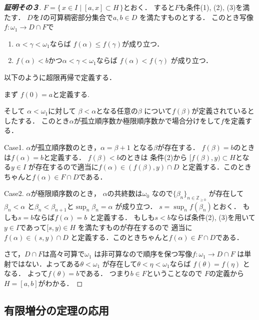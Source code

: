 \documentclass[leqno, a4paper, 12pt]{jsarticle}
\newcommand{\zz}{\mathbb{Z}}
\renewcommand{\labelenumi}{{\rm (\arabic{enumi})}}
\begin{document}
\begin{proof}[\textbf{証明その３}]
$F=\{\, x\in I\mid [a, x]\subset H\, \}$とおく．
すると$F$も条件(1), (2), (3)を満たす．
$D$を$I$の可算稠密部分集合で$a, b\in D$
を満たすものとする．
このとき写像
$f: \omega_{1}\to D\cap F$で
\begin{enumerate}
\renewcommand{\labelenumi}{(\alph{enumi})}
\item 
$\alpha<\gamma<\omega_{1}$ならば
$f(\alpha)\le f(\gamma)$が成り立つ．
\item 
$f(\alpha)<b$かつ$\alpha<\gamma<\omega_{1}$ならば
$f(\alpha)<f(\gamma)$
が成り立つ．

\end{enumerate}
以下のように超限再帰で定義する．

まず
$f(0)=a$と定義する. 

そして
$\alpha<\omega_{1}$に対して
$\beta<\alpha$となる任意の$\beta$
について$f(\beta)$が定義されているとしたする．
このとき$\alpha$が孤立順序数か極限順序数かで場合分けをして$f$を定義する．

Case1. $\alpha$が孤立順序数のとき，$\alpha=\beta+1$
となる$\beta$が存在する．
$f(\beta)=b$のときは$f(\alpha)=b$と定義する．
$f(\beta)<b$のときは
条件(2)から
$[f(\beta), y)\subset H$となる$y\in I$
が存在するので適当に$f(\alpha)\in (f(\beta), y)\cap D$
と定義する．このときちゃんと$f(\alpha)\in F\cap D$である．

Case2. $\alpha$が極限順序数のとき，
$\alpha$の共終数は$\omega_{0}$
なので$\{\beta_{n}\}_{n\in \zz_{\ge 0}}$
が存在して$\beta_{n}<\alpha$
と$\beta_{n}<\beta_{n+1}$と$\sup_{n}\beta_{n}=\alpha$
が成り立つ．
$s=\sup_{n}f(\beta_{n})$とおく．
もしも$s=b$ならば$f(\alpha)=b$
と定義する．
もしも$s<b$ならば条件(2), 
(3)を用いて$y\in I$であって$[s, y)\in H$
を満たすものが存在するので
適当に$f(\alpha)\in (s, y)\cap D$
と定義する．このときちゃんと$f(\alpha)\in F\cap D$である．

さて，$D\cap F$は高々可算で$\omega_{1}$
は非可算なので順序を保つ写像$f: \omega_{1}\to D\cap F$
は単射ではない．よってある$\theta<\omega_{1}$
が存在して$\theta<\eta<\omega_{1}$ならば
$f(\theta)=f(\eta)$
となる．
よって$f(\theta)=b$である．
つまり$b\in F$ということなので
$F$の定義から$H=[a, b]$がわかる．
\end{proof}


\subsection{有限増分の定理の応用}
\end{document}
